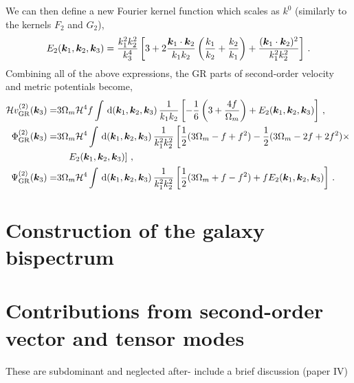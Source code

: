 We can then define a new Fourier kernel function which scales as $k^0$ (similarly to the kernels $F_2$ and $G_2$), 
\begin{equation}
	E_2(\bm {k}_1,\bm {k}_2,\bm {k}_3) = \frac{k_1^2 k_2^2}{k_3^4} \left[ 3 + 2\frac{\bm {k}_1\cdot\bm {k}_2}{k_1 k_2} \left( \frac{k_1}{k_2} + \frac{k_2}{k_1} \right) + \frac{(\bm {k}_1 \cdot \bm {k}_2)^2}{k_1^2 k_2^2} \right]\,.
\end{equation}
Combining all of the above expressions, the GR parts of second-order velocity and metric potentials become, 
\begin{align}
	\mathcal{H} v^{(2)}_{\mathrm{GR}}(\bm {k}_3) =& 3 \Omega_m \mathcal{H}^4 f \int \,\mathrm{d}(\bm {k}_1,\bm {k}_2,\bm {k}_3)\, \frac{1}{k_1 k_2} \left[ - \frac{1}{6} \left( 3 + \frac{4 f}{\Omega_m} \right) + E_2(\bm {k}_1,\bm {k}_2,\bm {k}_3) \right]\,,\\
	\Phi_{\mathrm{GR}}^{(2)}(\bm {k}_3) =& 3 \Omega_m \mathcal{H}^4 \int \,\mathrm{d}(\bm {k}_1,\bm {k}_2,\bm {k}_3)\, \frac{1}{k_1^2 k_2^2} \left[ \frac{1}{2} (3 \Omega_m - f + f^2)  - \frac{1}{2}(3 \Omega_m - 2f + 2 f^2)\times\right.\nonumber\\
	&\left. \quad E_2(\bm {k}_1,\bm {k}_2,\bm {k}_3) \right]\,,\\
	\Psi_{\mathrm{GR}}^{(2)}(\bm {k}_3) =& 3 \Omega_m \mathcal{H}^4 \int \,\mathrm{d}(\bm {k}_1,\bm {k}_2,\bm {k}_3)\, \frac{1}{k_1^2 k_2^2} \left[ \frac{1}{2} (3 \Omega_m + f - f^2) + f E_2(\bm {k}_1,\bm {k}_2,\bm {k}_3) \right]\,.
\end{align}


\section{Construction of the galaxy bispectrum}


\section{Contributions from second-order vector and tensor modes}\label{sec:tensorvector}

These are subdominant and neglected after- include a brief discussion (paper IV\cite{Jolicoeur:2018blf})



